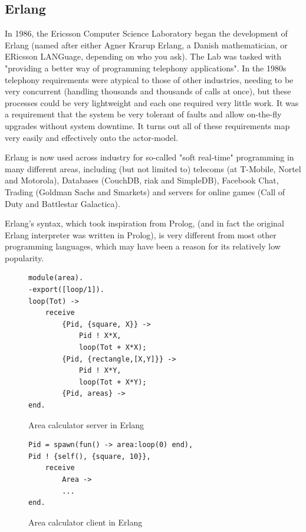 \documentclass[pdftex,11pt,a4paper]{report}
\begin{document}
\subsection{Erlang}

In 1986, the Ericsson Computer Science Laboratory began the development of Erlang\cite{armstrong2007} (named after either Agner Krarup Erlang, a Danish mathematician, or ERicsson LANGuage, depending on who you ask).
The Lab was tasked with "providing a better way of programming telephony applications".
In the 1980s telephony requirements were atypical to those of other industries, needing to be very concurrent (handling thousands and thousands of calls at once), but these processes could be very lightweight and each one required very little work.
It was a requirement that the system be very tolerant of faults and allow on-the-fly upgrades without system downtime.
It turns out all of these requirements map very easily and effectively onto the actor-model.

Erlang is now used across industry for so-called "soft real-time" programming in many different areas, including (but not limited to) telecoms (at T-Mobile, Nortel and Motorola), Databases (CouchDB, riak and SimpleDB), Facebook Chat, Trading (Goldman Sachs and Smarkets) and servers for online games (Call of Duty and Battlestar Galactica).

Erlang's syntax, which took inspiration from Prolog, (and in fact the original Erlang interpreter was written in Prolog), is very different from most other programming languages, which may have been a reason for its relatively low popularity.

\begin{figure}[H]
\begin{verbatim}
module(area).
-export([loop/1]).
loop(Tot) ->
    receive
        {Pid, {square, X}} ->
            Pid ! X*X,
            loop(Tot + X*X);
        {Pid, {rectangle,[X,Y]}} ->
            Pid ! X*Y,
            loop(Tot + X*Y);
        {Pid, areas} ->
end.
\end{verbatim}
\caption{Area calculator server in Erlang}
\label{fig:example_erlang_server}
\end{figure}

\begin{figure}[H]
\begin{verbatim}
Pid = spawn(fun() -> area:loop(0) end),
Pid ! {self(), {square, 10}},
    receive
        Area ->
        ...
end.
\end{verbatim}
\caption{Area calculator client in Erlang}
\label{fig:example_erlang_client}
\end{figure}
\end{document}
